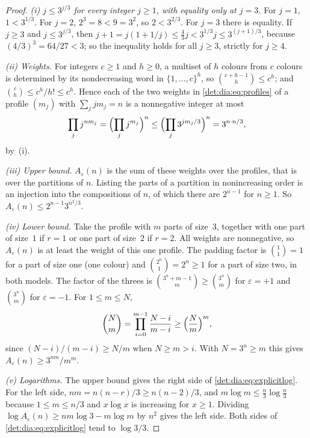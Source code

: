 \documentclass[11pt,letterpaper]{article}
\numberwithin{equation}{section}
\theoremstyle{definition}\newtheorem{definition}[theorem]{Definition}
\theoremstyle{remark}\newtheorem{remark}[theorem]{Remark}
\newcommand{\eps}{\varepsilon}
\begin{document}
\begin{proof}
\emph{(i) $j\le3^{j/3}$ for every integer $j\ge1$, with equality only at $j=3$.} For $j=1$, $1<3^{1/3}$. For $j=2$, $2^3=8<9=3^2$, so $2<3^{2/3}$. For $j=3$ there is equality. If $j\ge3$ and $j\le3^{j/3}$, then $j+1=j(1+1/j)\le\frac43j<3^{1/3}j\le3^{(j+1)/3}$, because $(4/3)^3=64/27<3$; so the inequality holds for all $j\ge3$, strictly for $j\ge4$.

\emph{(ii) Weights.} For integers $c\ge1$ and $h\ge0$, a multiset of $h$ colours from $c$ colours is determined by its nondecreasing word in $\{1,\ldots,c\}^h$, so $\binom{c+h-1}{h}\le c^h$; and $\binom ch\le c^h/h!\le c^h$. Hence each of the two weights in \eqref{det:dia:eq:profiles} of a profile $(m_j)$ with $\sum_jjm_j=n$ is a nonnegative integer at most
\[
 \prod_jj^{nm_j}=\Bigl(\prod_jj^{m_j}\Bigr)^n\le\Bigl(\prod_j3^{jm_j/3}\Bigr)^n=3^{n\cdot n/3},
\]
by~(i).

\emph{(iii) Upper bound.} $A_\eps(n)$ is the sum of these weights over the profiles, that is over the partitions of $n$. Listing the parts of a partition in nonincreasing order is an injection into the compositions of $n$, of which there are $2^{n-1}$ for $n\ge1$. So $A_\eps(n)\le2^{n-1}3^{n^2/3}$.

\emph{(iv) Lower bound.} Take the profile with $m$ parts of size~$3$, together with one part of size~$1$ if $r=1$ or one part of size~$2$ if $r=2$. All weights are nonnegative, so $A_\eps(n)$ is at least the weight of this one profile. The padding factor is $\binom{1}{1}=1$ for a part of size one (one colour) and $\binom{2^n}{1}=2^n\ge1$ for a part of size two, in both models. The factor of the threes is $\binom{3^n+m-1}{m}\ge\binom{3^n}{m}$ for $\eps=+1$ and $\binom{3^n}{m}$ for $\eps=-1$. For $1\le m\le N$,
\[
 \binom Nm=\prod_{i=0}^{m-1}\frac{N-i}{m-i}\ge\Bigl(\frac Nm\Bigr)^m,
\]
since $(N-i)/(m-i)\ge N/m$ when $N\ge m>i$. With $N=3^n\ge m$ this gives $A_\eps(n)\ge3^{nm}/m^m$.

\emph{(v) Logarithms.} The upper bound gives the right side of \eqref{det:dia:eq:explicitlog}. For the left side, $nm=n(n-r)/3\ge n(n-2)/3$, and $m\log m\le\frac n3\log\frac n3$ because $1\le m\le n/3$ and $x\log x$ is increasing for $x\ge1$. Dividing $\log A_\eps(n)\ge nm\log3-m\log m$ by $n^2$ gives the left side. Both sides of \eqref{det:dia:eq:explicitlog} tend to $\log3/3$.
\end{proof}
\end{document}
